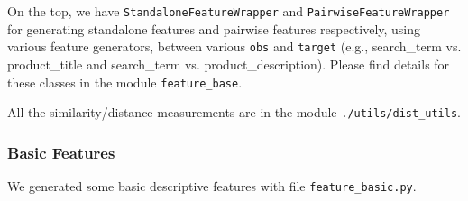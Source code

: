 \documentclass[12pt]{article}
\begin{document}
On the top, we have \texttt{StandaloneFeatureWrapper} and \texttt{PairwiseFeatureWrapper} for generating standalone features and pairwise features respectively, using various feature generators, between various \texttt{obs} and \texttt{target} (e.g., search\_term vs. product\_title and search\_term vs. product\_description). Please find details for these classes in the module \texttt{feature\_base}.

All the similarity/distance measurements are in the module \texttt{./utils/dist\_utils}.

\subsubsection{Basic Features}
\label{subsec:Basic_Features}
We generated some basic descriptive features with file \texttt{feature\_basic.py}.
\end{document}
